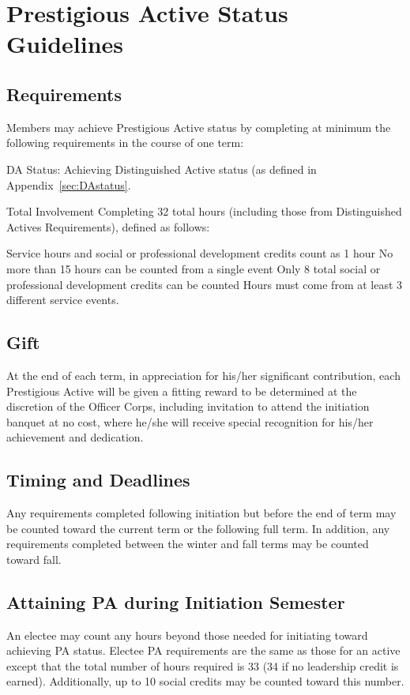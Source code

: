 \chapter{Prestigious Active Status Guidelines}\label{sec:PAstatus}
\section{Requirements} Members may achieve Prestigious Active status by completing at minimum the following requirements in the course of one term:
\begin{enumsubsection}
\item{DA Status:} Achieving Distinguished Active status (as defined in Appendix~\ref{sec:DAstatus}.
\item{Total Involvement} Completing 32 total hours (including those from Distinguished Actives Requirements), defined as follows:
\begin{compactenum}[1.]
\itemnotoc Service hours and social or professional development credits count as 1 hour
\itemnotoc No more than 15 hours can be counted from a single event
\itemnotoc Only 8 total social or professional development credits  can be counted
\itemnotoc Hours must come from at least 3 different service events.
\end{compactenum}
\end{enumsubsection}
\section{Gift} At the end of each term, in appreciation for his/her significant contribution, each Prestigious Active will be given a fitting reward to be determined at the discretion of the Officer Corps, including invitation to attend the initiation banquet at no cost, where he/she will receive special recognition for his/her achievement and dedication.
\section{Timing and Deadlines} Any requirements completed following initiation but before the end of term may be counted toward the current term or the following full term. In addition, any requirements completed between the winter and fall terms may be counted toward fall. 

\section{Attaining PA during Initiation Semester} An electee may count any hours beyond those needed for initiating toward achieving PA status. Electee PA requirements are the same as those for an active except that the total number of hours required is 33 (34 if no leadership credit is earned). Additionally, up to 10 social credits may be counted toward this number.
